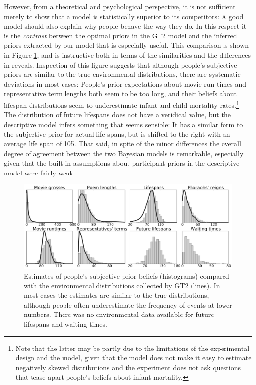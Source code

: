 \documentclass[doc,floatsintext]{apa6}
\begin{document}
However, from a theoretical and psychological perspective, it is not sufficient merely to show that a model is statistically superior to its competitors: A good model should also explain why people behave the way they do. In this respect it is the {\it contrast} between the optimal priors in the GT2 model and the inferred priors extracted by our model that is especially useful. This comparison is shown in Figure \ref{fig:predictions-priors-subjective-vs-empirical}, and is instructive both in terms of the similarities and the differences in reveals. Inspection of this figure suggests that although people's subjective priors are similar to the true environmental distributions, there are systematic deviations in most cases: People's prior expectations about movie run times and representative term lengths both seem to be too long, and their beliefs about lifespan distributions seem to underestimate infant and child mortality rates.\footnote{Note that the latter may be partly due to the limitations of the experimental design and the model, given that the model does not make it easy to estimate negatively skewed distributions and the experiment does not ask questions that tease apart people's beliefs about infant mortality.} The distribution of future lifespans does not have a veridical value, but the descriptive model infers something that seems sensible: It has a similar form to the subjective prior for actual life spans, but is shifted to the right with an average life span of 105. That said, in spite of the minor differences the overall degree of agreement between the two Bayesian models is remarkable, especially given that the built in assumptions about participant priors in the descriptive model were fairly weak.


\begin{figure}[t]
	\includegraphics[width=1.0\textwidth]{predictions_figures/priors-subjective-vs-empirical.pdf}
	\caption{Estimates of people's subjective prior beliefs (histograms) compared with the environmental distributions collected by GT2 (lines). In most cases the estimates are similar to the true distributions, although people often underestimate the frequency of events at lower numbers. There was no environmental data available for future lifespans and waiting times.}
	\label{fig:predictions-priors-subjective-vs-empirical}
\end{figure}
\end{document}
